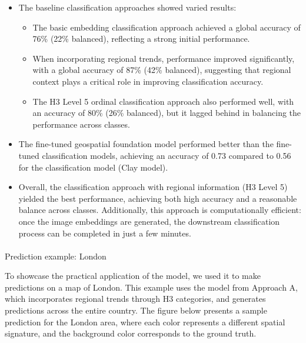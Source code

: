 \documentclass[
  letterpaper,
  DIV=11,
  numbers=noendperiod]{scrartcl}
\makeatletter
\let\oldparagraph\paragraph
\renewcommand{\paragraph}{
    \@ifstar
      \xxxParagraphStar
      \xxxParagraphNoStar
  }
\newcommand{\xxxParagraphStar}[1]{\oldparagraph*{#1}\mbox{}}
\newcommand{\xxxParagraphNoStar}[1]{\oldparagraph{#1}\mbox{}}
\providecommand{\tightlist}{%
  \setlength{\itemsep}{0pt}\setlength{\parskip}{0pt}}\usepackage{longtable,booktabs,array}
\makeatother
\begin{document}
\begin{itemize}
\item
  The baseline classification approaches showed varied results:

  \begin{itemize}
  \tightlist
  \item
    The basic embedding classification approach achieved a global
    accuracy of 76\% (22\% balanced), reflecting a strong initial
    performance.
  \item
    When incorporating regional trends, performance improved
    significantly, with a global accuracy of 87\% (42\% balanced),
    suggesting that regional context plays a critical role in improving
    classification accuracy.
  \item
    The H3 Level 5 ordinal classification approach also performed well,
    with an accuracy of 80\% (26\% balanced), but it lagged behind in
    balancing the performance across classes.
  \end{itemize}
\item
  The fine-tuned geospatial foundation model performed better than the
  fine-tuned classification models, achieving an accuracy of 0.73
  compared to 0.56 for the classification model (Clay model).
\item
  Overall, the classification approach with regional information (H3
  Level 5) yielded the best performance, achieving both high accuracy
  and a reasonable balance across classes. Additionally, this approach
  is computationally efficient: once the image embeddings are generated,
  the downstream classification process can be completed in just a few
  minutes.
\end{itemize}

\paragraph{Prediction example: London}\label{prediction-example-london}

To showcase the practical application of the model, we used it to make
predictions on a map of London. This example uses the model from
Approach A, which incorporates regional trends through H3 categories,
and generates predictions across the entire country. The figure below
presents a sample prediction for the London area, where each color
represents a different spatial signature, and the background color
corresponds to the ground truth.
\end{document}
